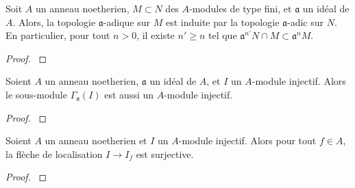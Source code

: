 \begin{thm}[de Krull]
Soit $A$ un anneau noetherien, $M\subset N$ des $A$-modules de type fini, et $\mathfrak{a}$ un idéal de $A$. Alors, la topologie $\mathfrak{a}$-adique sur $M$ est induite par la topologie $\mathfrak{a}$-adic sur $N$. En particulier, pour tout $n>0$, il existe $n'\geq n$ tel que $\mathfrak{a}^{n'}N\cap M\subset\mathfrak{a}^nM$.
\end{thm}
\begin{proof}
\cite[10.11]{atiyahmacdo}
\end{proof}

\begin{cor}\label{cohomAffLemme1}
Soient $A$ un anneau noetherien, $\mathfrak{a}$ un idéal de $A$, et $I$ un $A$-module injectif. Alors le sous-module $\Gamma_\mathfrak{a}(I)$ est aussi un $A$-module injectif.
\end{cor}
\begin{proof}
\cite[III.3.2]{Hartshorne} 
\end{proof}

\begin{lem}
Soient $A$ un anneau noetherien et $I$ un $A$-module injectif. Alors pour tout $f\in A$, la flèche de localisation $I\rightarrow I_f$ est surjective.
\end{lem}
\begin{proof}
\cite[III.3.3]{Hartshorne} 
\end{proof}


